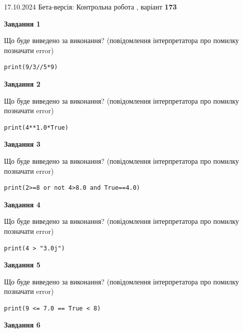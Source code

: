 \documentclass[12pt, ukrainian]{article}
\begin{document}
{\Large{17.10.2024 Бета-версія: Контрольна робота , варіант  \No \textbf { 173 }\par}}
{
\begin {large}
{\begin {center}\textbf{Завдання 1}\end {center}}

Що буде виведено за виконання? (повідомлення інтерпретатора про помилку позначати error)\par
\begin{verbatim}
print(9/3//5*9)
\end{verbatim}

{\begin {center}\textbf{Завдання 2}\end {center}}

Що буде виведено за виконання? (повідомлення інтерпретатора про помилку позначати error)\par
\begin{verbatim}
print(4**1.0*True)
\end{verbatim}

{\begin {center}\textbf{Завдання 3}\end {center}}

Що буде виведено за виконання? (повідомлення інтерпретатора про помилку позначати error)\par
\begin{verbatim}
print(2>=8 or not 4>8.0 and True==4.0)
\end{verbatim}

{\begin {center}\textbf{Завдання 4}\end {center}}

Що буде виведено за виконання? (повідомлення інтерпретатора про помилку позначати error)\par
\begin{verbatim}
print(4 > "3.0j")
\end{verbatim}

{\begin {center}\textbf{Завдання 5}\end {center}}

Що буде виведено за виконання? (повідомлення інтерпретатора про помилку позначати error)\par
\begin{verbatim}
print(9 <= 7.0 == True < 8)
\end{verbatim}

{\begin {center}\textbf{Завдання 6}\end {center}}


\end{large}}
\end{document}
